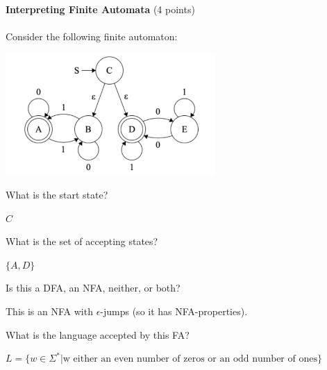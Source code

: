 \documentclass[12pt]{article}
\newenvironment{question}[2][Question]{\begin{trivlist}
\item[\hskip \labelsep {\bfseries #1}\hskip \labelsep {\bfseries #2.}]}{\end{trivlist}}
\newenvironment{solution}[1][Solution:]{\begin{trivlist}
\item[\hskip \labelsep {\bfseries #1}\hskip \labelsep {\bfseries}]\color{blue}}{\end{trivlist}}
\begin{document}
\clearpage
\begin{question}{4}\textbf{Interpreting  Finite Automata} (4 points)\\\\
Consider the following finite automaton:
\begin{center}
	\includegraphics[width=0.6\textwidth]{q4-FA.png}
\end{center}
\begin{enumerate}[(a)]
    \item What is the start state?
        \begin{solution}
            $C$
        \end{solution}
	\item What is the set of accepting states?
        \begin{solution}
            $\{A, D\}$
        \end{solution}
	\item Is this a DFA, an NFA, neither, or both?
        \begin{solution}
            This is an NFA with $\epsilon$-jumps (so it has NFA-properties).
        \end{solution} 
	\item What is the language accepted by this FA?
        \begin{solution}
            $L = \{ w \in \Sigma^* \vert \text{w either an even number of zeros or an odd number of ones} \}$
        \end{solution}  
	
\end{enumerate}
\end{question}
\end{document}
